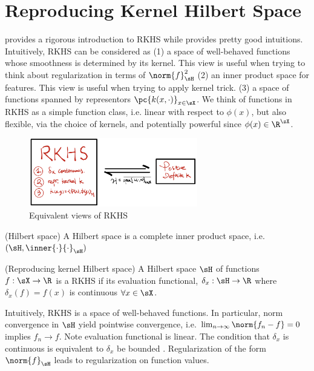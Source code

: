 \documentclass[11pt]{article}
\begin{document}
\section{Reproducing Kernel Hilbert Space}

\cite{grettonWhatRKHS2012} provides a rigorous introduction to RKHS while \cite{grettonIntroductionRKHSSimple2019} provides pretty good intuitions. 
Intuitively, RKHS can be considered as (1) a space of well-behaved functions whose smoothness is determined by its kernel. This view is useful when trying to think about regularization in terms of $\norm{f}_{\sH}^2$ (2) an inner product space for features. This view is useful when trying to apply kernel trick. (3) a space of functions spanned by representors $\pc{k(x,\cdot)}_{x\in\sX}$. We think of functions in RKHS as a simple function class, i.e. linear with respect to $\phi(x)$, but also flexible, via the choice of kernels, and potentially powerful since $\phi(x)\in\R^{\sX}$.


\begin{figure}[h!]
\begin{center}
    \includegraphics[height=3cm]{assets/rkhs_equivalence_schematics} 
    \caption{Equivalent views of RKHS}
\end{center}
\end{figure}


\begin{definition}
    (Hilbert space) A Hilbert space is a complete inner product space, i.e. $(\sH, \inner{\cdot}{\cdot}_{\sH})$
\end{definition}

\begin{definition}
    (Reproducing kernel Hilbert space) A Hilbert space $\sH$ of functions $f:\sX\to\R$ is a RKHS if its evaluation functional, $\delta_x:\sH\to\R$ where $\delta_x(f) = f(x)$ is continuous $\forall x\in\sX$.
\end{definition}

Intuitively, RKHS is a space of well-behaved functions. In particular, norm convergence in $\sH$ yield pointwise convergence, i.e. $\lim_{n\to\infty}\norm{f_n-f} = 0$ implies $f_n \to f$. Note evaluation functional is linear. The condition that $\delta_x$ is continuous is equivalent to $\delta_x$ be bounded \cite{grettonWhatRKHS2012}. Regularization of the form $\norm{f}_{\sH}$ leads to regularization on function values.
\end{document}
